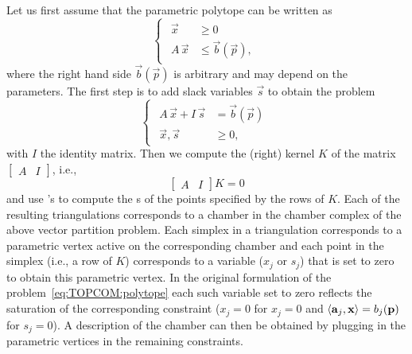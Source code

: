 Let us first assume that the parametric polytope can be written as
\begin{equation}
\label{eq:TOPCOM:polytope}
\begin{cases}
    \begin{aligned}
\vec x &\ge 0
\\
A \, \vec x &\le \vec b(\vec p)
,
    \end{aligned}
\end{cases}
\end{equation}
where the right hand side $\vec b(\vec p)$ is arbitrary and
may depend on the parameters.
The first step is to add slack variables $\vec s$ to obtain
the  problem
$$
\begin{cases}
    \begin{aligned}
A \, \vec x + I \, \vec s & = \vec b(\vec p)
\\
\vec x, \vec s &\ge 0
,
    \end{aligned}
\end{cases}
$$
with $I$ the identity matrix.
Then we compute the (right) kernel $K$ of the matrix
$\begin{bmatrix}
A & I
\end{bmatrix}$, i.e.,
$$
\begin{bmatrix}
A & I
\end{bmatrix}
K
=
0
$$
and use 's  to
compute the s of the points specified
by the rows of $K$.
Each of the resulting triangulations corresponds to a chamber
in the chamber complex of the above vector partition problem.
Each simplex in a triangulation corresponds to a parametric
vertex active on the corresponding chamber and
each point in the simplex (i.e., a row of $K$) corresponds
to a variable ($x_j$ or $s_j$) that is set to zero to obtain
this parametric vertex.
In the original formulation of the problem~\eqref{eq:TOPCOM:polytope}
each such variable set to zero reflects the saturation of the
corresponding constraint ($x_j = 0$ for $x_j = 0$ and
$\sps {\vec a_j}{\vec x} = b_j(\vec p)$ for $s_j = 0$).
A description of the chamber can then be obtained by plugging
in the parametric vertices in the remaining constraints.


